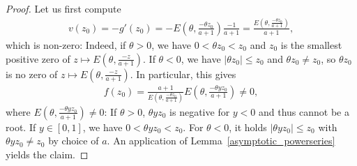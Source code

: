 \documentclass[12pt]{article}
\newcommand{\1}{\mathds{1}}
\theoremstyle{definition}
\theoremstyle{plain}
\theoremstyle{remark}
\begin{document}
\begin{proof}
   Let us first compute
   \begin{align*}
   v(z_0)=-g'(z_0)=-E\left(\theta,\frac{-\theta z_0}{a+1}\right)\frac{-1}{a+1} = \frac{E\left(\theta,\frac{-\theta z_0}{a+1}\right)}{a+1},
   \end{align*}
   which is non-zero: Indeed, if $\theta>0$, we have $0<\theta z_0<z_0$ and  $z_0$ is the smallest positive zero of $z\mapsto E\left(\theta,\frac{-z}{a+1}\right)$. If $\theta<0$, we have $|\theta z_0|\le z_0$ and $\theta z_0\neq z_0$, so $\theta z_0$ is no zero of $z\mapsto E\left(\theta,\frac{-z}{a+1}\right)$.
   In particular, this gives
   \begin{align*}%
       f(z_0)=\frac{a+1}{E\left(\theta,\frac{-\theta z_0}{a+1}\right)}E\left(\theta,\frac{-\theta yz_0}{a+1}\right)\neq 0,
   \end{align*}
   where $E\left(\theta,\frac{-\theta yz_0}{a+1}\right)\neq 0$: If $\theta>0$, $\theta y z_0$ is negative for $y<0$ and thus cannot be a root. If $y\in[0,1]$, we have $0<\theta y z_0<z_0$. For $\theta<0$, it holds $|\theta y z_0|\le z_0$ with $\theta y z_0\neq z_0$ by choice of $a$.
   An application of Lemma~\ref{asymptotic_powerseries} yields the claim.
    \end{proof}
\end{document}

